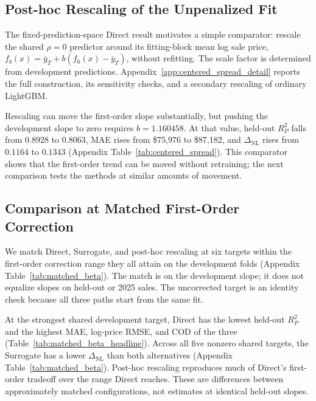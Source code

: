 \documentclass[10pt]{article}
\theoremstyle{definition}
\newcommand{\1}{\mathbf{1}}
\begin{document}
\subsection{Post-hoc Rescaling of the Unpenalized Fit}
\label{subsec:posthoc_comparator}

The fixed-prediction-space Direct result motivates a simple comparator: rescale the shared $\rho=0$ predictor around its fitting-block mean log sale price, $f_b(x)=\bar y_T+b(f_0(x)-\bar y_T)$, without refitting. The scale factor is determined from development predictions. Appendix~\ref{app:centered_spread_detail} reports the full construction, its sensitivity checks, and a secondary rescaling of ordinary LightGBM.

Rescaling can move the first-order slope substantially, but pushing the development slope to zero requires $b=1.160458$. At that value, held-out $R^2_P$ falls from $0.8928$ to $0.8063$, MAE rises from \$75,976 to \$87,182, and $\Delta_{\mathrm{NL}}$ rises from $0.1164$ to $0.1343$ (Appendix Table~\ref{tab:centered_spread}). This comparator shows that the first-order trend can be moved without retraining; the next comparison tests the methods at similar amounts of movement.

\subsection{Comparison at Matched First-Order Correction}
\label{subsec:matched_beta_results}

We match Direct, Surrogate, and post-hoc rescaling at six targets within the first-order correction range they all attain on the development folds (Appendix Table~\ref{tab:matched_beta}). The match is on the development slope; it does not equalize slopes on held-out or 2025 sales. The uncorrected target is an identity check because all three paths start from the same fit.

At the strongest shared development target, Direct has the lowest held-out $R^2_P$ and the highest MAE, log-price RMSE, and COD of the three (Table~\ref{tab:matched_beta_headline}). Across all five nonzero shared targets, the Surrogate has a lower $\Delta_{\mathrm{NL}}$ than both alternatives (Appendix Table~\ref{tab:matched_beta}). Post-hoc rescaling reproduces much of Direct's first-order tradeoff over the range Direct reaches. These are differences between approximately matched configurations, not estimates at identical held-out slopes.
\end{document}
